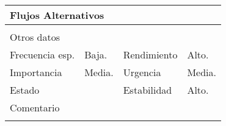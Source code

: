 \documentclass{article}
\begin{document}
\begin{table}[h]
\begin{tabular}{|l|l|l|l|l|l|}
\hline
\multicolumn{6}{|p{10cm}|}{Flujos Alternativos}\\
\hline
\multicolumn{1}{|p{1cm}}{} & \multicolumn{5}{|p{9cm}|}{}\\
\hline
\multicolumn{6}{|p{10cm}|}{Otros datos}\\
\hline
\multicolumn{1}{|p{2cm}|}{Frecuencia esp.} & \multicolumn{2}{p{3cm}}{Baja.} & \multicolumn{1}{|p{2cm}|}{Rendimiento} & \multicolumn{2}{p{3cm}|}{Alto.}\\
\hline
\multicolumn{1}{|p{2cm}|}{Importancia} & \multicolumn{2}{p{3cm}}{Media.} & \multicolumn{1}{|p{2cm}|}{Urgencia} & \multicolumn{2}{p{3cm}|}{Media.}\\
\hline
\multicolumn{1}{|p{2cm}|}{Estado} & \multicolumn{2}{p{3cm}}{} & \multicolumn{1}{|p{2cm}|}{Estabilidad} & \multicolumn{2}{p{3cm}|}{Alto.}\\
\hline
\multicolumn{6}{|p{10cm}|}{Comentario}\\
\hline
\multicolumn{6}{|p{10cm}|}{}\\
\hline
\end{tabular}
\end{table}


\end{document}

